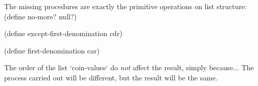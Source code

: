 The missing procedures are exactly the primitive operations on list structure:
\begtt\scm
(define no-more? null?)

(define except-first-denomination cdr)

(define first-denomination car)
\endtt

The order of the list `coin-values` do {\em not} affect the result, simply because...\nl
The process carried out will be different, but the result will be the same.
